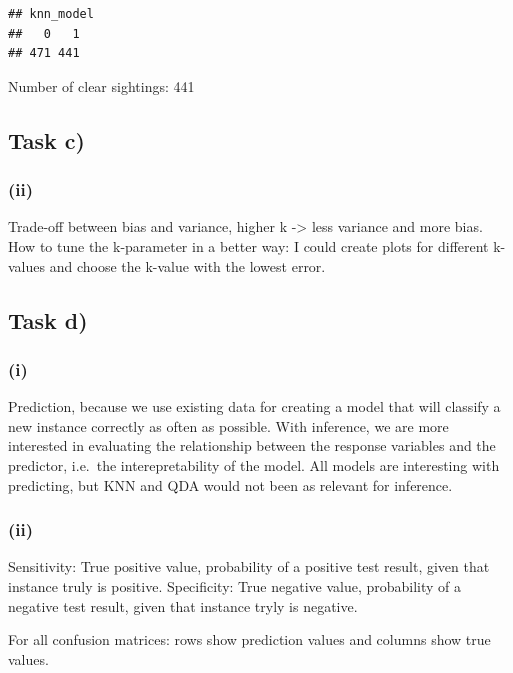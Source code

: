 \documentclass[
]{article}
\begin{document}
\begin{verbatim}
## knn_model
##   0   1 
## 471 441
\end{verbatim}

Number of clear sightings: 441

\hypertarget{task-c-1}{%
\subsection{Task c)}\label{task-c-1}}

\hypertarget{ii-4}{%
\subsubsection{(ii)}\label{ii-4}}

Trade-off between bias and variance, higher k -\textgreater{} less
variance and more bias. How to tune the k-parameter in a better way: I
could create plots for different k-values and choose the k-value with
the lowest error.

\hypertarget{task-d}{%
\subsection{Task d)}\label{task-d}}

\hypertarget{i-4}{%
\subsubsection{(i)}\label{i-4}}

Prediction, because we use existing data for creating a model that will
classify a new instance correctly as often as possible. With inference,
we are more interested in evaluating the relationship between the
response variables and the predictor, i.e.~the interepretability of the
model. All models are interesting with predicting, but KNN and QDA would
not been as relevant for inference.

\hypertarget{ii-5}{%
\subsubsection{(ii)}\label{ii-5}}

Sensitivity: True positive value, probability of a positive test result,
given that instance truly is positive. Specificity: True negative value,
probability of a negative test result, given that instance tryly is
negative.

For all confusion matrices: rows show prediction values and columns show
true values.
\end{document}
